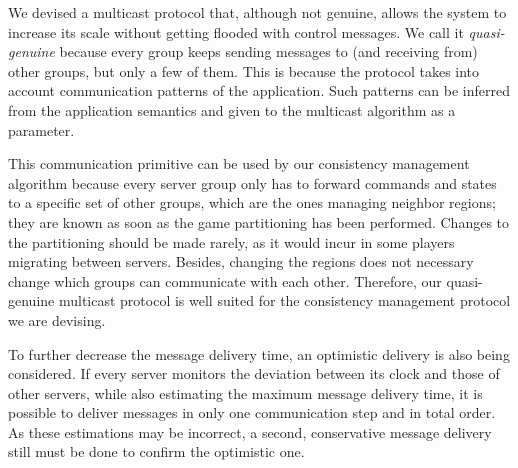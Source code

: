 \documentclass[]{usiinfprospectus}
\begin{document}
We devised a multicast protocol that, although not genuine, allows the system to increase its scale without getting flooded with control messages. We call it \emph{quasi-genuine} because every group keeps sending messages to (and receiving from) other groups, but only a few of them. This is because the protocol takes into account 
communication patterns of the application. Such patterns can be inferred from the application semantics and given to the multicast algorithm as a parameter.


This communication primitive can be used by our consistency management algorithm because every server group only has to forward commands and states to a specific set of other groups, which are the ones managing neighbor regions; they are known as soon as the game partitioning has been performed. Changes to the partitioning should be made rarely, as it would incur in some players migrating between servers. Besides, changing the regions does not necessary change which groups can communicate with each other. Therefore, our quasi-genuine multicast protocol is well suited for the consistency management protocol we are devising.

To further decrease the message delivery time, an optimistic delivery is also being considered. If every server monitors the deviation between its clock and those of other servers, while also estimating the maximum message delivery time, it is possible to deliver messages in only one communication step and in total order. As these estimations may be incorrect, a second, conservative message delivery still must be done to confirm the optimistic one.
\end{document}
